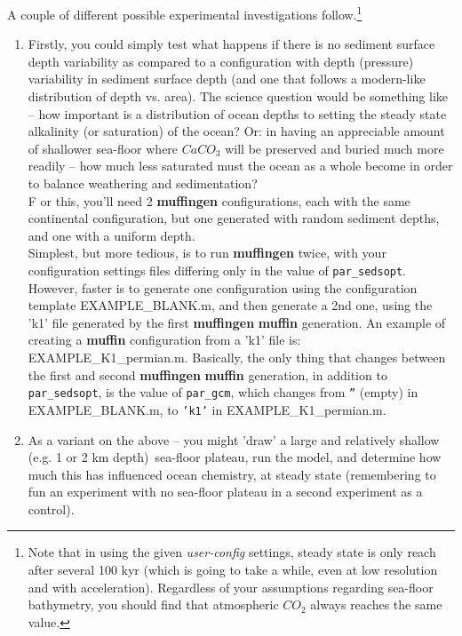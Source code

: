\documentclass[11pt,fleqn]{book} %
\begin{document}
\noindent A couple of different possible experimental investigations follow.\footnote{Note that in using the given \textit{user-config} settings, steady state is only reach after several 100 kyr (which is going to take a while, even at low resolution and with acceleration). Regardless of your assumptions regarding sea-floor bathymetry, you should find that atmospheric \(CO_{2}\) always reaches the same value.
}
\begin{enumerate}[noitemsep]

\vspace{1mm}
\item Firstly, you could simply test what happens if there is no sediment surface depth variability as compared to a configuration with depth (pressure) variability in sediment surface depth (and one that follows a modern-like distribution of depth vs. area). The science question would be something like -- how important is a distribution of ocean depths to setting the steady state alkalinity (or saturation) of the ocean? Or: in having an appreciable amount of shallower sea-floor where \(CaCO_{3}\) will be preserved and buried much more readily -- how much less saturated must the ocean as a whole become in order to balance weathering and sedimentation?
\\F or this, you'll need 2 \textbf{muffingen} configurations, each with the same continental configuration, but one generated with random sediment depths, and one with a uniform depth.
\\Simplest, but more tedious, is to run \textbf{muffingen} twice, with your  configuration settings files differing only in the value of \texttt{par\_sedsopt}. However, faster is to generate one configuration using the configuration template \textsf{\footnotesize EXAMPLE\_BLANK.m}, and then generate a 2nd one, using the 'k1' file generated by the first \textbf{muffingen} \textbf{muffin} generation. An example of creating a \textbf{muffin} configuration from a 'k1' file is: \textsf{\footnotesize EXAMPLE\_K1\_permian.m}. Basically, the only thing that changes between the first and second \textbf{muffingen} \textbf{muffin} generation, in addition to \texttt{par\_sedsopt}, is the value of \texttt{par\_gcm}, which changes from \texttt{''} (empty) in \textsf{\footnotesize EXAMPLE\_BLANK.m}, to \texttt{'k1'} in \textsf{\footnotesize EXAMPLE\_K1\_permian.m}.

\vspace{1mm}
\item As a variant on the above -- you might 'draw' a large and relatively shallow (e.g. 1 or 2 km depth)\ sea-floor plateau, run the model, and determine how much this has influenced ocean chemistry, at steady state (remembering to fun an experiment with no sea-floor plateau in a second experiment as a control).


\end{enumerate}
\end{document}
